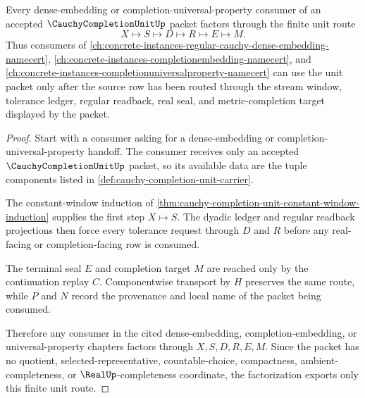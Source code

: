 \begin{theorem}
\label{thm:cauchy-completion-unit-dense-embedding-universal-route}
Every dense-embedding or completion-universal-property consumer of an accepted $\CauchyCompletionUnitUp$ packet factors through the finite unit route
$$
X\longmapsto S\longmapsto D\longmapsto R\longmapsto E\longmapsto M .
$$
Thus consumers of \autoref{ch:concrete-instances-regular-cauchy-dense-embedding-namecert}, \autoref{ch:concrete-instances-completionembedding-namecert}, and \autoref{ch:concrete-instances-completionuniversalproperty-namecert} can use the unit packet only after the source row has been routed through the stream window, tolerance ledger, regular readback, real seal, and metric-completion target displayed by the packet.
\end{theorem}
\begin{proof}
Start with a consumer asking for a dense-embedding or completion-universal-property handoff. The consumer receives only an accepted $\CauchyCompletionUnitUp$ packet, so its available data are the tuple components listed in \autoref{def:cauchy-completion-unit-carrier}.

The constant-window induction of \autoref{thm:cauchy-completion-unit-constant-window-induction} supplies the first step $X\mapsto S$. The dyadic ledger and regular readback projections then force every tolerance request through $D$ and $R$ before any real-facing or completion-facing row is consumed.

The terminal seal $E$ and completion target $M$ are reached only by the continuation replay $C$. Componentwise transport by $H$ preserves the same route, while $P$ and $N$ record the provenance and local name of the packet being consumed.

Therefore any consumer in the cited dense-embedding, completion-embedding, or universal-property chapters factors through $X,S,D,R,E,M$. Since the packet has no quotient, selected-representative, countable-choice, compactness, ambient-completeness, or $\RealUp$-completeness coordinate, the factorization exports only this finite unit route.
\end{proof}

